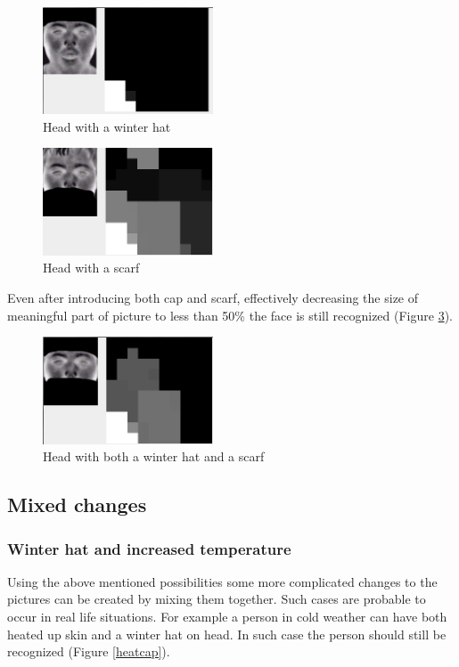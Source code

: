 \documentclass[pdftex]{article}
\begin{document}
\begin{figure}[!htb]
	\centering
	\includegraphics[width=0.45\textwidth]{pictures/cap.png} 
	\caption{Head with a winter hat}
	\label{cap}
\end{figure}
\begin{figure}[!htb]
	\centering
	\includegraphics[width=0.45\textwidth]{pictures/scarf.png} 
	\caption{Head with a scarf}
	\label{pictures}
\end{figure}

\clearpage
Even after introducing both cap and scarf, effectively decreasing the size of meaningful part of picture to less than 50\% the face is still recognized (Figure \ref{capscarf}).

\begin{figure}[!htb]
	\centering
	\includegraphics[width=0.45\textwidth]{pictures/capscarf.png} 
	\caption{Head with both a winter hat and a scarf}
	\label{capscarf}
\end{figure}

\subsection{Mixed changes}
\subsubsection{Winter hat and increased temperature}
Using the above mentioned possibilities some more complicated changes to the pictures can be created by mixing them together. Such cases are probable to occur in real life situations. For example a person in cold weather can have both heated up skin and a winter hat on head. In such case the person should still be recognized (Figure \ref{heatcap}).
\end{document}
